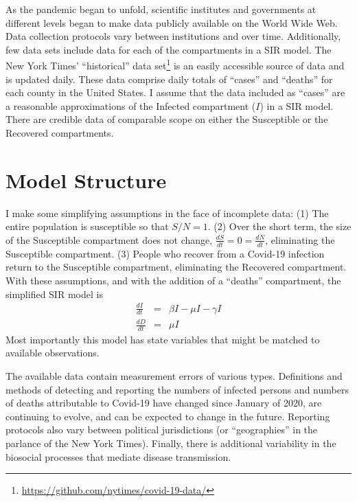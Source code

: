 \documentclass[12pt,letterpaper]{article}
\begin{document}

As the pandemic began to unfold, scientific institutes and governments
at different levels began to make data publicly available on the
World Wide Web.
Data collection protocols vary between institutions and over time. 
Additionally, few data sets include data for each of
the compartments in a SIR model. 
The New York Times' ``historical'' 
data set\footnote{\label{ff:nyt}\url{https://github.com/nytimes/covid-19-data/}}
is an easily accessible source of data and is updated daily. These data
comprise daily totals of ``cases'' and ``deaths'' for each county
in the United States. I assume that the data included as ``cases'' are
a reasonable approximations of the Infected compartment ($I$) in a SIR
model. There are credible data of comparable scope on
either the Susceptible or the Recovered compartments.

\section*{Model Structure}
I make some simplifying assumptions in the face of incomplete data: 
(1) The entire population is susceptible so that $S/N = 1$. 
(2) Over the short term, the size of the
Susceptible compartment does not change, 
$\frac{dS}{dt} = 0 = \frac{dN}{dt}$,
eliminating the Susceptible compartment.
(3) People who recover from a Covid-19 infection return to the Susceptible
compartment, eliminating the Recovered compartment. 
With these assumptions, and with the addition of a ``deaths''
compartment, the simplified SIR model is
\begin{eqnarray}
\label{eqn:sSIRI}
\frac{dI}{dt} &=&  \beta I - \mu I -\gamma I\\
\label{eqn:sSIRD}
\frac{dD}{dt} &=& \mu I
\end{eqnarray}
Most importantly this model
has state variables that might be matched to available observations.

The available data contain measurement errors of various types.
Definitions and methods of detecting and reporting the numbers of
infected persons and numbers of deaths attributable to Covid-19 have
changed since January of 2020, are continuing to evolve, and can be
expected to change in the future.
Reporting protocols also vary between political jurisdictions (or
``geographies'' in the parlance of the New York Times).
Finally, there is additional variability in the biosocial
processes that mediate disease transmission.
\end{document}
